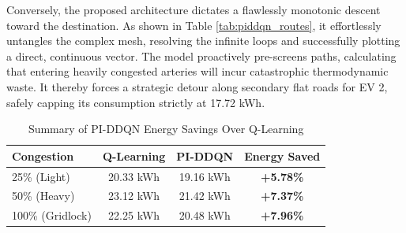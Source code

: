 \documentclass[journal, a4paper, twocolumn]{IEEEtran}
\begin{document}
\begin{table}[htbp]
\centering
\caption{PI-DDQN Evaluated Routes (Proposed)}
\label{tab:piddqn_routes}
\end{table}

Conversely, the proposed architecture dictates a flawlessly monotonic descent toward the destination. As shown in Table \ref{tab:piddqn_routes}, it effortlessly untangles the complex mesh, resolving the infinite loops and successfully plotting a direct, continuous vector. The model proactively pre-screens paths, calculating that entering heavily congested arteries will incur catastrophic thermodynamic waste. It thereby forces a strategic detour along secondary flat roads for EV 2, safely capping its consumption strictly at 17.72 kWh. 

\begin{table}[htbp]
\centering
\caption{Summary of PI-DDQN Energy Savings Over Q-Learning}
\label{tab:energy_savings}
\footnotesize
\begin{tabular}{|l|c|c|c|}
\hline
\textbf{Congestion} & \textbf{Q-Learning} & \textbf{PI-DDQN} & \textbf{Energy Saved} \\ \hline
25\% (Light) & 20.33 kWh & 19.16 kWh & \textbf{+5.78\%} \\ 
50\% (Heavy) & 23.12 kWh & 21.42 kWh & \textbf{+7.37\%} \\ 
100\% (Gridlock) & 22.25 kWh & 20.48 kWh & \textbf{+7.96\%} \\ \hline
\end{tabular}
\end{table}
\end{document}
